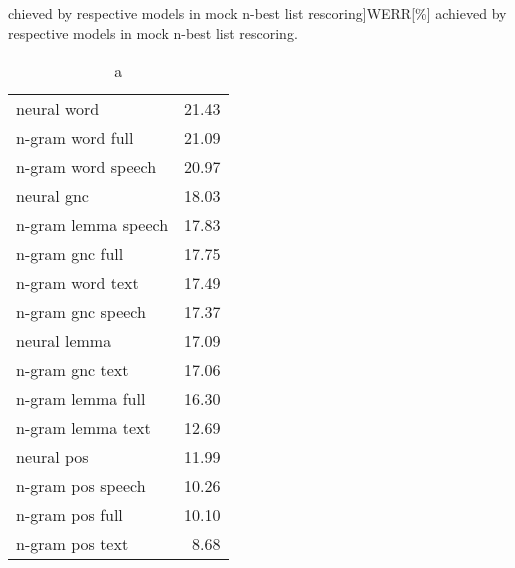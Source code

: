 \begin{table}[!htbp]
	\centering
	\caption[WERR[\%] achieved by respective models in mock \mbox{n-best} list rescoring]{WERR[\%] achieved by respective models in mock \mbox{n-best} list rescoring.}
	\label{table:max_werr}
	\begin{tabular*}{.4\linewidth}{@{\extracolsep{\fill}}lr}
		neural word   & 21.43\\
		n-gram word full  & 21.09\\
		n-gram word speech  & 20.97\\
		neural gnc    & 18.03\\
		n-gram lemma speech  & 17.83\\
		n-gram gnc full  & 17.75\\
		n-gram word text  & 17.49\\
		n-gram gnc speech  & 17.37\\
		neural lemma  & 17.09\\
		n-gram gnc text  & 17.06\\
		n-gram lemma full  & 16.30\\
		n-gram lemma text  & 12.69\\
		neural pos    & 11.99\\
		n-gram pos speech  & 10.26\\
		n-gram pos full  & 10.10\\
		n-gram pos text  & 8.68\\
	\end{tabular*}
\end{table}
